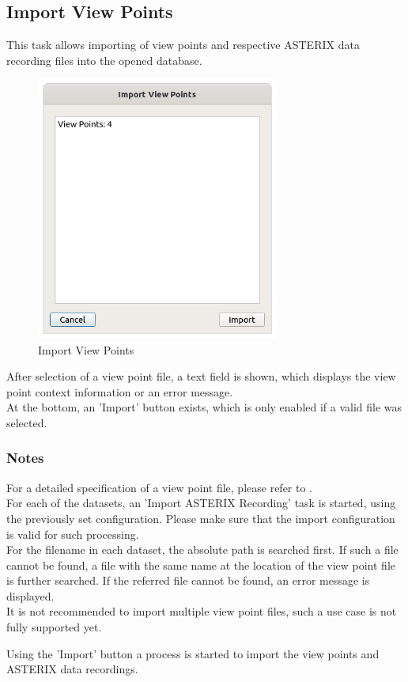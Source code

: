 \subsection{Import View Points}
\label{sec:ui_import_viewpoints}

This task allows importing of view points and respective ASTERIX data recording files into the opened database. \\

\begin{figure}[H]
  \center
    \includegraphics[width=8cm]{figures/view_point_import.png}
  \caption{Import View Points}
\end{figure}

After selection of a view point file, a text field is shown, which displays the view point context information or an error message. \\

At the bottom, an 'Import' button exists, which is only enabled if a valid file was selected.

\subsubsection{Notes}

For a detailed specification of a view point file, please refer to . \\

For each of the datasets, an 'Import ASTERIX Recording' task is started, using the previously set configuration. Please make sure that the import configuration is valid for such processing. \\

For the filename in each dataset, the absolute path is searched first. If such a file cannot be found, a file with the same name at the location of the view point file is further searched. 
If the referred file cannot be found, an error message is displayed. \\

It is not recommended to import multiple view point files, such a use case is not fully supported yet.

Using the 'Import' button a process is started to import the view points and ASTERIX data recordings. \\

